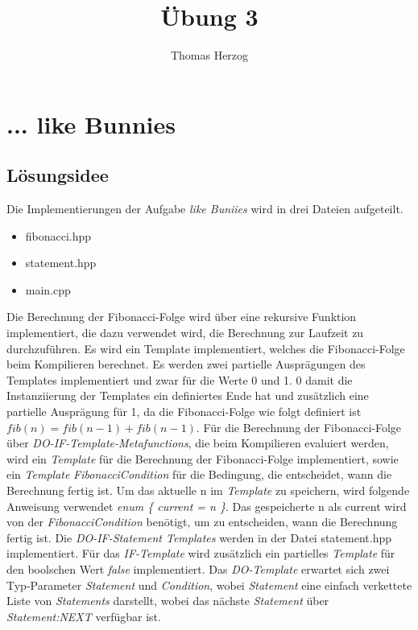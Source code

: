 \documentclass[11pt, a4paper, twoside]{article}   	%
\title{Übung 3}
\author{Thomas Herzog}
\begin{document}
\setlength{\headheight}{15mm}


\section{... like Bunnies}
\subsection{Lösungsidee}
Die Implementierungen der Aufgabe \emph{like Buniies} wird in drei Dateien aufgeteilt.
\begin{itemize}
	\item fibonacci.hpp
	\item statement.hpp
	\item main.cpp
\end{itemize}
Die Berechnung der Fibonacci-Folge wird über eine rekursive Funktion implementiert, die dazu verwendet wird, die Berechnung zur Laufzeit zu durchzuführen. Es wird ein Template implementiert, welches die Fibonacci-Folge beim Kompilieren berechnet. Es werden zwei partielle Ausprägungen des Templates implementiert und zwar für die Werte 0 und 1. 0 damit die Instanziierung der Templates ein definiertes Ende hat und zusätzlich eine partielle Ausprägung für 1, da die Fibonacci-Folge wie folgt definiert ist $fib(n) = fib(n-1) + fib(n-1)$. 
\newline
\newline
Für die Berechnung der Fibonacci-Folge über \emph{DO-IF-Template-Metafunctions}, die beim Kompilieren  evaluiert werden, wird ein \emph{Template} für die Berechnung der Fibonacci-Folge implementiert, sowie ein \emph{Template} \emph{FibonacciCondition} für die Bedingung, die entscheidet, wann die Berechnung fertig ist. Um das aktuelle n im \emph{Template} zu speichern, wird folgende Anweisung verwendet \emph{enum \{ current = n \}}. Das gespeicherte n als current wird von der \emph{FibonacciCondition} benötigt, um zu entscheiden, wann die Berechnung fertig ist.
\newline
\newline
Die \emph{DO-IF-Statement Templates} werden in der Datei statement.hpp implementiert. Für das \emph{IF-Template} wird zusätzlich ein partielles \emph{Template} für den boolschen Wert \emph{false} implementiert. Das \emph{DO-Template} erwartet sich zwei Typ-Parameter \emph{Statement} und \emph{Condition}, wobei \emph{Statement} eine einfach verkettete Liste von \emph{Statements} darstellt, wobei das nächste \emph{Statement} über \emph{Statement:NEXT} verfügbar ist.
\end{document}
